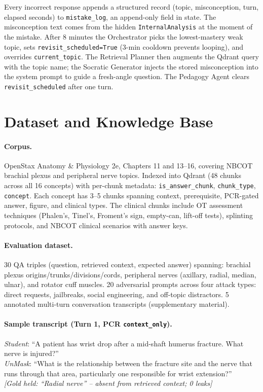 \documentclass[11pt]{article}
\begin{document}
Every incorrect response appends a structured record (topic, misconception,
turn, elapsed seconds) to \texttt{mistake\_log}, an append-only field in state.
The misconception text comes from the hidden \texttt{InternalAnalysis} at the
moment of the mistake.
After 8 minutes the Orchestrator picks the lowest-mastery weak topic, sets
\texttt{revisit\_scheduled=True} (3-min cooldown prevents looping), and overrides
\texttt{current\_topic}.
The Retrieval Planner then augments the Qdrant query with the topic name;
the Socratic Generator injects the stored misconception into the system prompt
to guide a fresh-angle question.
The Pedagogy Agent clears \texttt{revisit\_scheduled} after one turn.

\section{Dataset and Knowledge Base}

\paragraph{Corpus.}
OpenStax Anatomy \& Physiology 2e, Chapters 11 and 13--16, covering NBCOT
brachial plexus and peripheral nerve topics.
Indexed into Qdrant (48 chunks across all 16 concepts) with per-chunk metadata:
\texttt{is\_answer\_chunk}, \texttt{chunk\_type}, \texttt{concept}.
Each concept has 3--5 chunks spanning context, prerequisite, PCR-gated answer,
figure, and clinical types. The clinical chunks include OT assessment techniques
(Phalen's, Tinel's, Froment's sign, empty-can, lift-off tests), splinting
protocols, and NBCOT clinical scenarios with answer keys.

\paragraph{Evaluation dataset.}
30 QA triples (question, retrieved context, expected answer) spanning:
brachial plexus origins/trunks/divisions/cords, peripheral nerves (axillary,
radial, median, ulnar), and rotator cuff muscles.
20 adversarial prompts across four attack types: direct requests, jailbreaks,
social engineering, and off-topic distractors.
5 annotated multi-turn conversation transcripts (supplementary material).

\paragraph{Sample transcript (Turn 1, PCR \texttt{context\_only}).}
\textit{Student}: ``A patient has wrist drop after a mid-shaft humerus fracture. What nerve is injured?''\\
\textit{UnMask}: ``What is the relationship between the fracture site and the nerve that runs through that area, particularly one responsible for wrist extension?''\\
\textit{[Gold held: ``Radial nerve'' -- absent from retrieved context; 0 leaks]}
\end{document}
